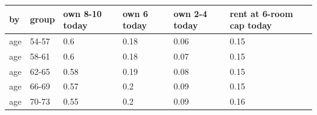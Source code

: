\begingroup\small
\setlength{\tabcolsep}{3pt}
\renewcommand{\arraystretch}{1.04}
\begin{tabularx}{\linewidth}{XXXXXX}
\toprule
by & group & own 8-10 today & own 6 today & own 2-4 today & rent at 6-room cap today \\
\midrule
age & 54-57 & 0.6 & 0.18 & 0.06 & 0.15 \\
age & 58-61 & 0.6 & 0.18 & 0.07 & 0.15 \\
age & 62-65 & 0.58 & 0.19 & 0.08 & 0.15 \\
age & 66-69 & 0.57 & 0.2 & 0.09 & 0.15 \\
age & 70-73 & 0.55 & 0.2 & 0.09 & 0.16 \\
\bottomrule
\end{tabularx}
\endgroup
